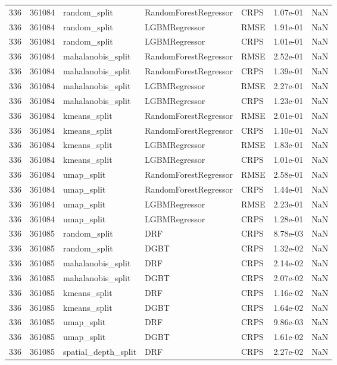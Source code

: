 \begin{tabular}{rrlllrr}
336 & 361084 & random\_split & RandomForestRegressor & CRPS & 1.07e-01 & NaN \\
336 & 361084 & random\_split & LGBMRegressor & RMSE & 1.91e-01 & NaN \\
336 & 361084 & random\_split & LGBMRegressor & CRPS & 1.01e-01 & NaN \\
336 & 361084 & mahalanobis\_split & RandomForestRegressor & RMSE & 2.52e-01 & NaN \\
336 & 361084 & mahalanobis\_split & RandomForestRegressor & CRPS & 1.39e-01 & NaN \\
336 & 361084 & mahalanobis\_split & LGBMRegressor & RMSE & 2.27e-01 & NaN \\
336 & 361084 & mahalanobis\_split & LGBMRegressor & CRPS & 1.23e-01 & NaN \\
336 & 361084 & kmeans\_split & RandomForestRegressor & RMSE & 2.01e-01 & NaN \\
336 & 361084 & kmeans\_split & RandomForestRegressor & CRPS & 1.10e-01 & NaN \\
336 & 361084 & kmeans\_split & LGBMRegressor & RMSE & 1.83e-01 & NaN \\
336 & 361084 & kmeans\_split & LGBMRegressor & CRPS & 1.01e-01 & NaN \\
336 & 361084 & umap\_split & RandomForestRegressor & RMSE & 2.58e-01 & NaN \\
336 & 361084 & umap\_split & RandomForestRegressor & CRPS & 1.44e-01 & NaN \\
336 & 361084 & umap\_split & LGBMRegressor & RMSE & 2.23e-01 & NaN \\
336 & 361084 & umap\_split & LGBMRegressor & CRPS & 1.28e-01 & NaN \\
336 & 361085 & random\_split & DRF & CRPS & 8.78e-03 & NaN \\
336 & 361085 & random\_split & DGBT & CRPS & 1.32e-02 & NaN \\
336 & 361085 & mahalanobis\_split & DRF & CRPS & 2.14e-02 & NaN \\
336 & 361085 & mahalanobis\_split & DGBT & CRPS & 2.07e-02 & NaN \\
336 & 361085 & kmeans\_split & DRF & CRPS & 1.16e-02 & NaN \\
336 & 361085 & kmeans\_split & DGBT & CRPS & 1.64e-02 & NaN \\
336 & 361085 & umap\_split & DRF & CRPS & 9.86e-03 & NaN \\
336 & 361085 & umap\_split & DGBT & CRPS & 1.61e-02 & NaN \\
336 & 361085 & spatial\_depth\_split & DRF & CRPS & 2.27e-02 & NaN \\

\end{tabular}
